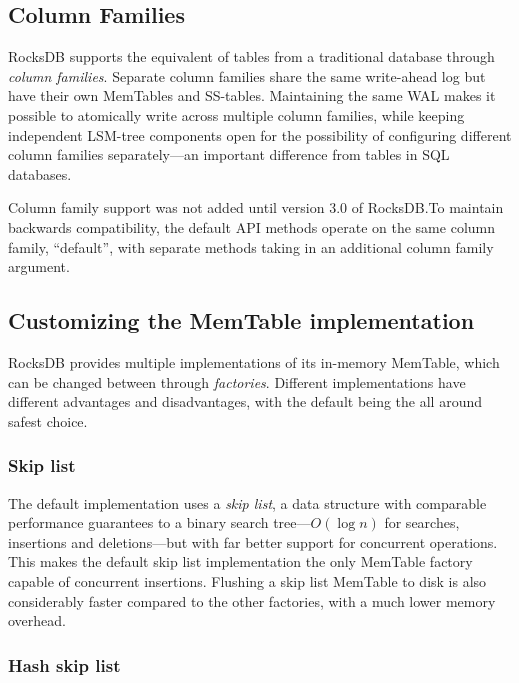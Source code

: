 \subsection{Column Families}

RocksDB supports the equivalent of tables from a traditional database through
\textit{column
families}.
Separate column families share the same write-ahead log but have their own
MemTables and SS-tables. Maintaining the same WAL makes it possible to
atomically write across multiple column families, while keeping independent
LSM-tree components open for the possibility of configuring different column
families separately---an important difference from tables in SQL databases.

Column family support was not added until version 3.0 of RocksDB.\@ To maintain
backwards compatibility, the default API methods operate on the same column
family, ``default'', with separate methods taking in an additional column family
argument.

\subsection{Customizing the MemTable implementation}\label{sec:memtable-impl}

RocksDB provides multiple implementations of its in-memory
MemTable, which can be
changed between through \textit{factories}. Different implementations have
different advantages and disadvantages, with the default being the all around
safest choice.

\subsubsection{Skip list}

The default implementation uses a \textit{skip list}, a data structure with
comparable performance guarantees to a binary search tree---$ O(\log n) $ for
searches, insertions and deletions---but with far better support for concurrent
operations. This makes the default skip list implementation the only MemTable
factory capable of concurrent insertions. Flushing a skip list MemTable to disk
is also considerably faster compared to the other factories, with a much lower
memory overhead.

\subsubsection{Hash skip list}

